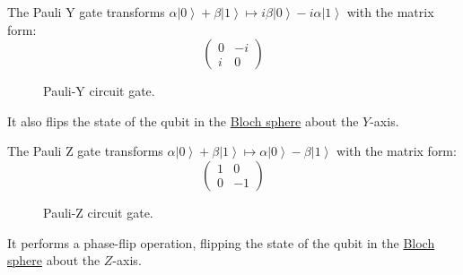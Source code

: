 \documentclass{article}
\newcommand{\ket}[1]{\ensuremath{\left|#1\right\rangle}}
\newcounter{definition}[section]
\begin{document}
    \begin{definition}[Pauli Y]
      \label{def:pauli-y}
      The Pauli Y gate transforms $\alpha \ket{0} + \beta \ket{1} \mapsto  i \beta \ket{0} - i \alpha \ket{1}$ with the matrix form: 
      \begin{equation} 
        \begin{pmatrix} 0 & -i \\ i & 0 \end{pmatrix}
      \end{equation}

      \begin{figure}[H]
        \centering 
        \caption{Pauli-Y circuit gate.} 
        \label{fig:pauliy}
      \end{figure}
      It also flips the state of the qubit in the \hyperref[def:bloch-sphere]{Bloch sphere} about the $Y$-axis. 
    \end{definition}

    \begin{definition}[Pauli Z]
      \label{def:pauli-z}
      The Pauli Z gate transforms $\alpha \ket{0} + \beta \ket{1} \mapsto \alpha \ket{0} - \beta \ket{1}$ with the matrix form: 
      \begin{equation} 
        \begin{pmatrix} 1 & 0 \\ 0 & -1 \end{pmatrix}
      \end{equation}
      \begin{figure}[H]
        \centering 
        \caption{Pauli-Z circuit gate.} 
        \label{fig:pauliz}
      \end{figure}
      It performs a phase-flip operation, flipping the state of the qubit in the \hyperref[def:bloch-sphere]{Bloch sphere} about the $Z$-axis.
    \end{definition}
\end{document}
